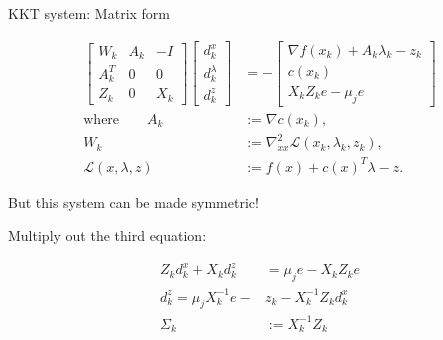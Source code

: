 \documentclass{beamer}
\begin{document}
\begin{frame}{KKT system: Matrix form}

  \begin{align*}
    \begin{bmatrix}
      W_k   & A_k & -I  \\
      A_k^T & 0   & 0   \\
      Z_k   & 0   & X_k
    \end{bmatrix}
    \begin{bmatrix}
      d_k^x       \\
      d_k^\lambda \\
      d_k^z
    \end{bmatrix}
                             & =
    -
    \begin{bmatrix}
      \nabla f(x_k) + A_k \lambda_k - z_k \\
      c(x_k)                              \\
      X_k Z_k e - \mu_j e
    \end{bmatrix}                                        \\[0.8em]
    \text{where}\qquad
    A_k                      & := \nabla c(x_k),                               \\
    W_k                      & := \nabla^2_{xx}\mathcal{L}(x_k,\lambda_k,z_k), \\
    \mathcal{L}(x,\lambda,z) & := f(x) + c(x)^T\lambda - z.
  \end{align*}

  But this system can be made symmetric!

  Multiply out the third equation:

  \vspace{-1.0em}
  \begin{align*}
    Z_k d_k^x + X_k d_k^z      & = \mu_j e - X_k Z_k e    \\
    d_k^z = \mu_j X_k^{-1} e - & z_k - X_k^{-1} Z_k d_k^x \\
    \Sigma_k                   & := X_k^{-1} Z_k
  \end{align*}

\end{frame}
\end{document}
